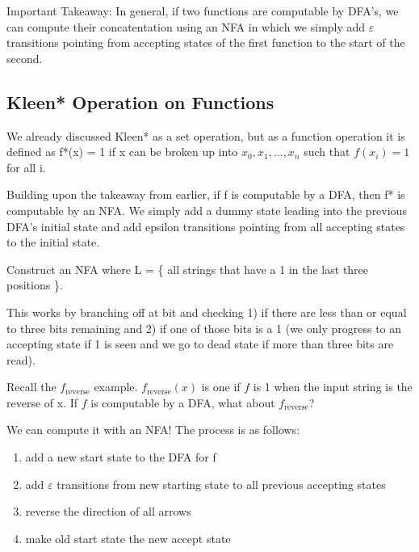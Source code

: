 Important Takeaway: In general, if two functions are computable by DFA's, we can compute their concatentation using an NFA in which we simply add $\varepsilon$ transitions pointing from accepting states of the first function to the start of the second.
\begin{center}
\end{center}

\subsection*{Kleen* Operation on Functions}
We already discussed Kleen* as a set operation, but as a function operation it is defined as f*(x) = 1 if x can be broken up into $x_0, x_1, ..., x_n$ such that $f(x_i) = 1$ for all i.

Building upon the takeaway from earlier, if f is computable by a DFA, then f* is computable by an NFA. We simply add a dummy state leading into the previous DFA's initial state and add epsilon transitions pointing from all accepting states to the initial state.
\begin{center}
\end{center}

\begin{example}
    Construct an NFA where L = \{ all strings that have a 1 in the last three positions \}.

    \begin{center}
    \end{center}

    This works by branching off at bit and checking 1) if there are less than or equal to three bits remaining and 2) if one of those bits is a 1 (we only progress to an accepting state if 1 is seen and we go to dead state if more than three bits are read).
\end{example}

\hr 

Recall the $f_{\text{reverse}}$ example. $f_{\text{reverse}}(x)$ is one if $f$ is 1 when the input string is the reverse of x. If $f$ is computable by a DFA, what about $f_{\text{reverse}}$? 

We can compute it with an NFA! The process is as follows:
\begin{enumerate}
    \item add a new start state to the DFA for f
    \item add $\varepsilon$ transitions from new starting state to all previous accepting states
    \item reverse the direction of all arrows
    \item make old start state the new accept state
\end{enumerate}

